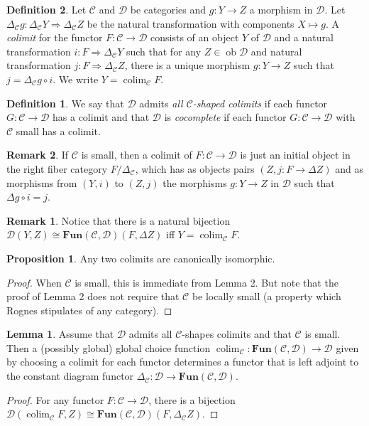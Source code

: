 \documentclass[10pt,letterpaper,cm]{nupset}
\theoremstyle{definition}
\newtheorem*{definition}{Definition}
\newtheorem{remark}{Remark}
\newtheorem{lemma}{Lemma}
\newtheorem{prop}{Proposition}
\newcommand{\1}{\mathbf{1}}
\renewcommand{\c}{\mathscr{C}}
\renewcommand{\d}{\mathscr{D}}
\newcommand{\0}{\vec 0}
\DeclareMathOperator{\ob}{ob}
\DeclareMathOperator{\colim}{colim}
\begin{document}
\begin{definition}
Let $\c$ and $\d$ be categories and $g: Y \to Z$ a morphism in $\d$. Let $\Delta_{\c} g : \Delta_{\c} Y \Rightarrow \Delta_{\c} Z$ be the natural transformation with components $X \mapsto g$. A \textit{colimit} for the functor $F: \c \to \d$ consists of an object $Y$ of $\d$ and a natural transformation $i : F \Rightarrow \Delta_{\c} Y$ such that for any $Z \in \ob \d$ and natural transformation $j: F \Rightarrow \Delta_{\c} Z$, there is a unique morphism $g: Y \to Z$ such that $j = \Delta_{\c}g \circ i$. We write $Y = \colim_{\c} F$.
\begin{definition} We say that $\d$ admits \textit{all $\c$-shaped colimits} if each functor $G: \c \to \d$ has a colimit and that $\d$ is \textit{cocomplete} if each functor $G : \c \to \d$ with $\c$ small has a colimit.
\end{definition}
\end{definition}

\begin{remark}
If $\c$ is small, then a colimit of $F: \c \to \d$ is just an initial object in the right fiber category $F/\Delta_{\c}$, which has as objects pairs $(Z, j: F \to \Delta Z)$ and as morphisms from $(Y, i)$ to $(Z, j)$ the morphisms $g : Y \to Z$ in $\d$ such that $\Delta g \circ i = j$.
\begin{remark}
Notice that there is a natural bijection $\d(Y, Z) \cong \mathbf{Fun}(\c, \d)(F, \Delta Z)$ iff $Y = \colim_{\c}F$.
\end{remark}
\end{remark}

\begin{prop}
Any two colimits are canonically isomorphic.
\end{prop}
\begin{proof}
When $\c$ is small, this is immediate from Lemma 2. But note that the proof of Lemma 2 does not require that $\c$ be locally small (a property which Rognes stipulates of any category). 
\end{proof}

\begin{lemma}
Assume that $\d$ admits all $\c$-shapes colimits and that $\c$ is small. Then a (possibly global) global choice function $\colim_\c : \mathbf{Fun}(\c, \d) \to \d$ given by choosing a colimit for each functor determines a functor that is left adjoint to the constant diagram functor $\Delta_{\c} : \d \to \mathbf{Fun}(\c, \d)$.
\end{lemma}
\begin{proof}
For any functor $F : \c \to \d$, there is a bijection $\d(\colim_{\c} F, Z) \cong \mathbf{Fun}(\c, \d)(F, \Delta_{\c}Z)$.
\end{proof}
\end{document}
